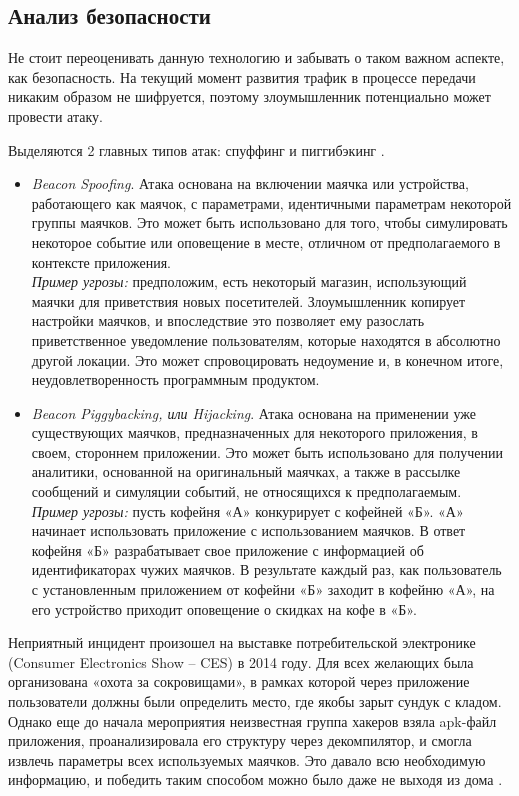 \subsection{Анализ безопасности}

Не стоит переоценивать данную технологию и забывать о таком важном аспекте, как безопасность. На текущий момент развития трафик в процессе передачи никаким образом не шифруется, поэтому злоумышленник потенциально может провести атаку.

Выделяются 2 главных типов атак: спуффинг и пиггибэкинг \cite{web:SecuritySlides}.

\begin{itemize}
    \item
    \textit{Beacon Spoofing}. Атака основана на включении маячка или устройства, работающего как маячок, с параметрами, идентичными параметрам некоторой группы маячков. Это может быть использовано для того, чтобы симулировать некоторое событие или оповещение в месте, отличном от предполагаемого в контексте приложения. \\
    \textit{Пример угрозы:} предположим, есть некоторый магазин, использующий маячки для приветствия новых посетителей. Злоумышленник копирует настройки маячков, и впоследствие это позволяет ему разослать приветственное уведомление пользователям, которые находятся в абсолютно другой локации. Это может спровоцировать недоумение и, в конечном итоге, неудовлетворенность программным продуктом.
    \item
    \textit{Beacon Piggybacking, или Hijacking}. Атака основана на применении уже существующих маячков, предназначенных для некоторого приложения, в своем, стороннем приложении. Это может быть использовано для получении аналитики, основанной на оригинальный маячках, а также в рассылке сообщений и симуляции событий, не относящихся к предполагаемым. \\
    \textit{Пример угрозы:} пусть кофейня «А» конкурирует с кофейней «Б». «А» начинает использовать приложение с использованием маячков. В ответ кофейня «Б» разрабатывает свое приложение с информацией об идентификаторах чужих маячков. В результате каждый раз, как пользователь с установленным приложением от кофейни «Б» заходит в кофейню «А», на его устройство приходит оповещение о скидках на кофе в «Б».
\end{itemize}

Неприятный инцидент произошел на выставке потребительской электронике (Consumer Electronics Show – CES) в 2014 году. Для всех желающих была организована «охота за сокровищами», в рамках которой через приложение пользователи должны были определить место, где якобы зарыт сундук с кладом. Однако еще до начала мероприятия неизвестная группа хакеров взяла apk-файл приложения, проанализировала его структуру через декомпилятор, и смогла извлечь параметры всех используемых маячков. Это давало всю необходимую информацию, и победить таким способом можно было даже не выходя из дома \cite{web:ScavengeHunt}.


